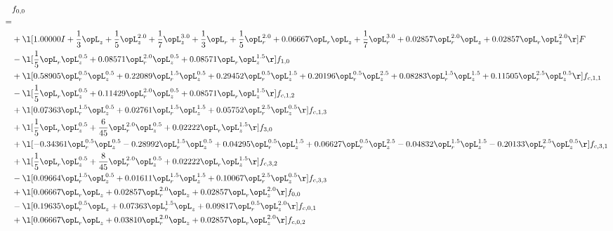 \begin{alignat}{2} 
\label{eq:f_00_1} 
& f_{0,0} \nonumber \\ 
 = \\ 
& + \l[  1.00000 I + \frac{1}{3} \opL_z + \frac{1}{5} \opL_z^{2.0} + \frac{1}{7} \opL_z^{3.0} + \frac{1}{3} \opL_r + \frac{1}{5} \opL_r^{2.0} +  0.06667 \opL_r \opL_z + \frac{1}{7} \opL_r^{3.0} +  0.02857 \opL_r^{2.0} \opL_z +  0.02857 \opL_r \opL_z^{2.0}  \r] F \nonumber \\ 
& - \l[ \frac{1}{5} \opL_r \opL_z^{0.5} +  0.08571 \opL_r^{2.0} \opL_z^{0.5} +  0.08571 \opL_r \opL_z^{1.5}  \r] f_{1,0} \nonumber \\ 
& + \l[  0.58905 \opL_r^{0.5} \opL_z^{0.5} +  0.22089 \opL_r^{1.5} \opL_z^{0.5} +  0.29452 \opL_r^{0.5} \opL_z^{1.5} +  0.20196 \opL_r^{0.5} \opL_z^{2.5} +  0.08283 \opL_r^{1.5} \opL_z^{1.5} +  0.11505 \opL_r^{2.5} \opL_z^{0.5}  \r] f_{c,1,1} \nonumber \\ 
& - \l[ \frac{1}{5} \opL_r \opL_z^{0.5} +  0.11429 \opL_r^{2.0} \opL_z^{0.5} +  0.08571 \opL_r \opL_z^{1.5}  \r] f_{c,1,2} \nonumber \\ 
& + \l[  0.07363 \opL_r^{1.5} \opL_z^{0.5} +  0.02761 \opL_r^{1.5} \opL_z^{1.5} +  0.05752 \opL_r^{2.5} \opL_z^{0.5}  \r] f_{c,1,3} \nonumber \\ 
& + \l[ \frac{1}{5} \opL_r \opL_z^{0.5} + \frac{6}{45} \opL_r^{2.0} \opL_z^{0.5} +  0.02222 \opL_r \opL_z^{1.5}  \r] f_{3,0} \nonumber \\ 
& + \l[  -0.34361 \opL_r^{0.5} \opL_z^{0.5}   -0.28992 \opL_r^{1.5} \opL_z^{0.5} +  0.04295 \opL_r^{0.5} \opL_z^{1.5} +  0.06627 \opL_r^{0.5} \opL_z^{2.5}   -0.04832 \opL_r^{1.5} \opL_z^{1.5}   -0.20133 \opL_r^{2.5} \opL_z^{0.5}  \r] f_{c,3,1} \nonumber \\ 
& + \l[ \frac{1}{5} \opL_r \opL_z^{0.5} + \frac{8}{45} \opL_r^{2.0} \opL_z^{0.5} +  0.02222 \opL_r \opL_z^{1.5}  \r] f_{c,3,2} \nonumber \\ 
& - \l[  0.09664 \opL_r^{1.5} \opL_z^{0.5} +  0.01611 \opL_r^{1.5} \opL_z^{1.5} +  0.10067 \opL_r^{2.5} \opL_z^{0.5}  \r] f_{c,3,3} \nonumber \\ 
& + \l[  0.06667 \opL_r \opL_z +  0.02857 \opL_r^{2.0} \opL_z +  0.02857 \opL_r \opL_z^{2.0}  \r] f_{0,0} \nonumber \\ 
& - \l[  0.19635 \opL_r^{0.5} \opL_z +  0.07363 \opL_r^{1.5} \opL_z +  0.09817 \opL_r^{0.5} \opL_z^{2.0}  \r] f_{c,0,1} \nonumber \\ 
& + \l[  0.06667 \opL_r \opL_z +  0.03810 \opL_r^{2.0} \opL_z +  0.02857 \opL_r \opL_z^{2.0}  \r] f_{c,0,2} \nonumber \\ 

\end{alignat}
